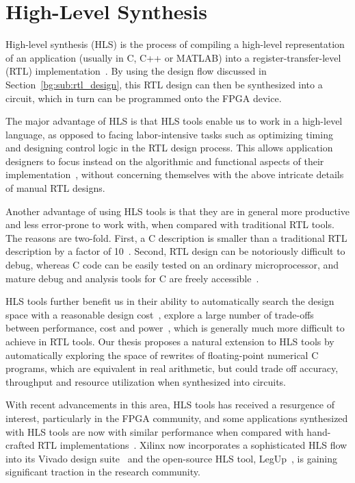 \section{High-Level Synthesis}
\label{bg:sec:high_level_synthesis}

High-level synthesis (HLS) is the process of compiling a high-level
representation of an application (usually in C, C++ or MATLAB) into a
register-transfer-level (RTL) implementation~\cite{coussy, gajski}.  By
using the design flow discussed in Section~\ref{bg:sub:rtl_design}, this
RTL design can then be synthesized into a circuit, which in turn can be
programmed onto the FPGA device.

The major advantage of HLS is that HLS tools enable us to work in a high-level
language, as opposed to facing labor-intensive tasks such as optimizing timing
and designing control logic in the RTL design process.  This allows application
designers to focus instead on the algorithmic and functional aspects of their
implementation~\cite{coussy}, without concerning themselves with the above
intricate details of manual RTL designs.

Another advantage of using HLS tools is that they are in general more
productive and less error-prone to work with, when compared with traditional
RTL tools.  The reasons are two-fold.  First, a C description is smaller than
a traditional RTL description by a factor of 10~\cite{coussy, bdti}.  Second,
RTL design can be notoriously difficult to debug, whereas C code can be easily
tested on an ordinary microprocessor, and mature debug and analysis tools for C
are freely accessible~\cite{canis13}.

HLS tools further benefit us in their ability to automatically search the
design space with a reasonable design cost~\cite{bdti}, explore a large number
of trade-offs between performance, cost and power~\cite{mcfarland}, which is
generally much more difficult to achieve in RTL tools.  Our thesis proposes
a natural extension to HLS tools by automatically exploring the space of
rewrites of floating-point numerical C programs, which are equivalent in real
arithmetic, but could trade off accuracy, throughput and resource utilization
when synthesized into circuits.

With recent advancements in this area, HLS tools has received a resurgence of
interest, particularly in the FPGA community, and some applications synthesized
with HLS tools are now with similar performance when compared with hand-crafted
RTL implementations~\cite{bdti}.  Xilinx now incorporates a sophisticated HLS
flow into its Vivado design suite~\cite{vivado_hls} and the open-source HLS
tool, LegUp~\cite{legup}, is gaining significant traction in the research
community.


